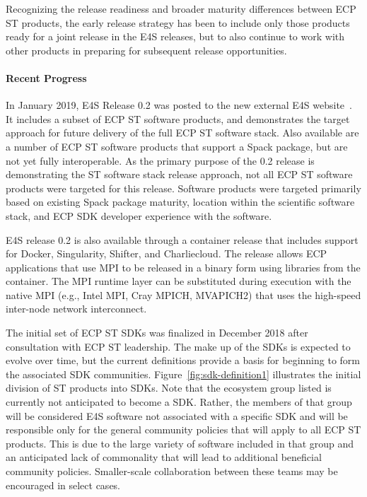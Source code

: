 Recognizing the release readiness and broader maturity differences between ECP ST products, the early release strategy has been to include only those products ready for a joint release in the E4S releases, but to also continue to work with other products in preparing for subsequent release opportunities.

\paragraph{Recent Progress}
In January 2019, E4S Release 0.2 was posted to the new external E4S website~\cite{e4s:homepage}. It includes a subset of ECP ST software products, and demonstrates the target approach for future delivery of the full ECP ST software stack. Also available are a number of ECP ST software products that support a Spack package, but are not yet fully interoperable. As the primary purpose of the 0.2 release is demonstrating the ST software stack release approach, not all ECP ST software products were targeted for this release. Software products were targeted primarily based on existing Spack package maturity, location within the scientific software stack, and ECP SDK developer experience with the software.

E4S release 0.2 is also available through a container release that includes support for Docker, Singularity, Shifter, and Charliecloud. The release allows ECP applications that use MPI to be released in a binary form using libraries from the container. The MPI runtime layer can be substituted during execution with the native MPI (e.g., Intel MPI, Cray MPICH, MVAPICH2) that uses the high-speed inter-node network interconnect.

The initial set of ECP ST SDKs was finalized in December 2018 after consultation with ECP ST leadership. The make up of the SDKs is expected to evolve over time, but the current definitions provide a basis for beginning to form the associated SDK communities. Figure~\ref{fig:sdk-definition1} illustrates the initial division of ST products into SDKs. Note that the ecosystem group listed is currently not anticipated to become a SDK. Rather, the members of that group will be considered E4S software not associated with a specific SDK and will be responsible only for the general community policies that will apply to all ECP ST products. This is due to the large variety of software included in that group and an anticipated lack of commonality that will lead to additional beneficial community policies. Smaller-scale collaboration between these teams may be encouraged in select cases.

